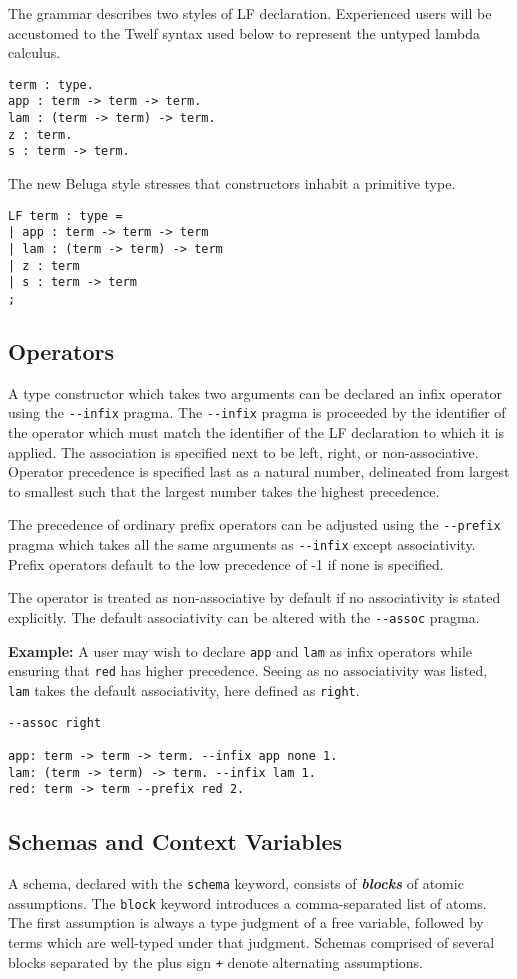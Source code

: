 \documentclass[11pt]{article}
\begin{document}
The grammar describes two styles of LF declaration. Experienced users will be accustomed to the Twelf syntax used below to represent the untyped lambda calculus.
\begin{verbatim}
term : type.
app : term -> term -> term.
lam : (term -> term) -> term.
z : term.
s : term -> term.
\end{verbatim}

The new Beluga style stresses that constructors inhabit a primitive type.
\begin{verbatim}
LF term : type =
| app : term -> term -> term
| lam : (term -> term) -> term
| z : term
| s : term -> term
;
\end{verbatim}

\subsection{Operators}
A type constructor which takes two arguments can be declared an infix operator using the \texttt{-{}-infix} pragma. The \texttt{-{}-infix} pragma is proceeded by the identifier of the operator which must match the identifier of the LF declaration to which it is applied. The association is specified next to be left, right, or non-associative. Operator precedence is specified last as a natural number, delineated from largest to smallest such that the largest number takes the highest precedence.

The precedence of ordinary prefix operators can be adjusted using the \texttt{-{}-prefix} pragma which takes all the same arguments as \texttt{-{}-infix} except associativity. Prefix operators default to the low precedence of -1 if none is specified.

The operator is treated as non-associative by default if no associativity is stated explicitly. The default associativity can be altered with the \texttt{-{}-assoc} pragma.

\textbf{Example:} A user may wish to declare \texttt{app} and \texttt{lam} as infix operators while ensuring that \texttt{red} has higher precedence. Seeing as no associativity was listed, \texttt{lam} takes the default associativity, here defined as \texttt{right}.
\begin{verbatim}
--assoc right

app: term -> term -> term. --infix app none 1.
lam: (term -> term) -> term. --infix lam 1.
red: term -> term --prefix red 2. 
\end{verbatim}

\subsection{Schemas and Context Variables}
A schema, declared with the \texttt{schema} keyword, consists of \textbf{\textit{blocks}} of atomic assumptions. The \texttt{block} keyword introduces a comma-separated list of atoms. The first assumption is always a type judgment of a free variable, followed by terms which are well-typed under that judgment. Schemas comprised of several blocks separated by the plus sign \texttt{+} denote alternating assumptions. 
\end{document}
